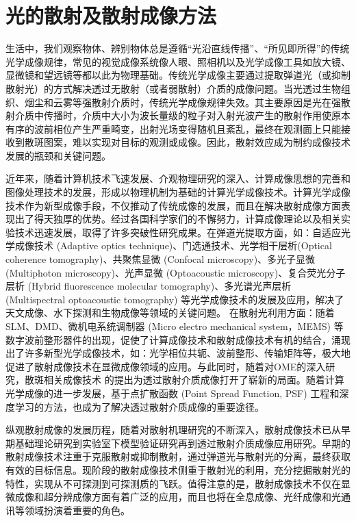 
\chapter{光的散射及散射成像方法}\label{chap:2}
生活中，我们观察物体、辨别物体总是遵循“光沿直线传播”、“所见即所得”的传统光学成像规律，常见的视觉成像系统像人眼、照相机以及光学成像工具如放大镜、显微镜和望远镜等都以此为物理基础。传统光学成像主要通过提取弹道光（或抑制散射光）的方式解决透过无散射（或者弱散射）介质的成像问题。当光透过生物组织、烟尘和云雾等强散射介质时，传统光学成像规律失效。其主要原因是光在强散射介质中传播时，介质中大小为波长量级的粒子对入射光波产生的散射作用使原本有序的波前相位产生严重畸变，出射光场变得随机且紊乱，最终在观测面上只能接收到散斑图案，难以实现对目标的观测或成像。因此，散射效应成为制约成像技术发展的瓶颈和关键问题。

近年来，随着计算机技术飞速发展、介观物理研究的深入、计算成像思想的完善和图像处理技术的发展，形成以物理机制为基础的计算光学成像技术。计算光学成像技术作为新型成像手段，不仅推动了传统成像的发展，而且在解决散射成像方面表现出了得天独厚的优势。经过各国科学家们的不懈努力，计算成像理论以及相关实验技术迅速发展，取得了许多突破性研究成果。在弹道光提取方面，如：自适应光学成像技术 (Adaptive optics technique)、门选通技术、光学相干层析(Optical coherence tomography)\cite{huang_optical_1991}、共聚焦显微 (Confocal microscopy)\cite{webb_confocal_1996}、多光子显微 (Multiphoton microscopy)\cite{denk_two_photon_1990,helmchen_deep_2005}、光声显微 (Optoacoustic microscopy)\cite{zhang_functional_2006,wang_multiscale_2009}、复合荧光分子层析 (Hybrid fluorescence molecular tomography)\cite{ale_fmt_xct_2012}、多光谱光声层析 (Multispectral optoacoustic tomography)\cite{razansky_volumetric_2011,ntziachristos_going_2010} 等光学成像技术的发展及应用，解决了天文成像、水下探测和生物成像等领域的关键问题。
在散射光利用方面：随着SLM、DMD、微机电系统调制器 (Micro electro mechanical system，MEMS) 等数字波前整形器件的出现，促使了计算成像技术和散射成像技术有机的结合，涌现出了许多新型光学成像技术，如：光学相位共轭\cite{yaqoob_optical_2008}、波前整形\cite{Vellekoop2007,vellekoop_exploiting_2010,conkey_genetic_2012,blochet_fast_2017}、传输矩阵\cite{Popoff2010}等，极大地促进了散射成像技术在显微成像领域的应用。与此同时，随着对OME\cite{Freund1988}的深入研究，散斑相关成像技术 的提出为透过散射介质成像打开了崭新的局面。随着计算光学成像的进一步发展，基于点扩散函数 (Point Spread Function, PSF) 工程\cite{sahoo_single-shot_2017}和深度学习\cite{li_deep_2018}的方法，也成为了解决透过散射介质成像的重要途径。

纵观散射成像的发展历程，随着对散射机理研究的不断深入，散射成像技术已从早期基础理论研究到实验室下模型验证研究再到透过散射介质成像应用研究。早期的散射成像技术注重于克服散射或抑制散射，通过弹道光与散射光的分离，最终获取有效的目标信息。现阶段的散射成像技术侧重于散射光的利用，充分挖掘散射光的特性，实现从不可探测到可探测质的飞跃。值得注意的是，散射成像技术不仅在显微成像和超分辨成像方面有着广泛的应用，而且也将在全息成像、光纤成像和光通讯等领域扮演着重要的角色。

